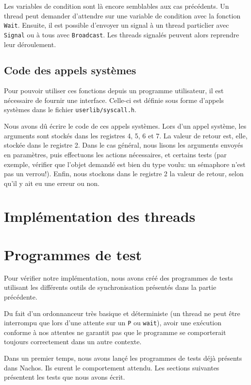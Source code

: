 \documentclass{article}
\def\file#1{\texttt{#1}}
\def\fun#1{\texttt{#1}}
\begin{document}
  Les variables de condition sont là encore semblables aux cas précédents. Un thread peut demander d'attendre sur une variable de condition avec la fonction \fun{Wait}. Ensuite, il est possible d'envoyer un signal à un thread particlier avec \fun{Signal} ou à tous avec \fun{Broadcast}. Les threads signalés peuvent alors reprendre leur déroulement.

\subsection{Code des appels systèmes}

  Pour pouvoir utiliser ces fonctions depuis un programme utilisateur, il est nécessaire de fournir une interface. Celle-ci est définie sous forme d'appels systèmes dans le fichier \file{userlib/syscall.h}.

  Nous avons dû écrire le code de ces appels systèmes. Lors d'un appel système, les arguments sont stockés dans les registres 4, 5, 6 et 7. La valeur de retour est, elle, stockée dans le registre 2.
  Dans le cas général, nous lisons les arguments envoyés en paramètres, puis effectuons les actions nécessaires, et certains tests (par exemple, vérifier que l'objet demandé est bien du type voulu: un sémaphore n'est pas un verrou!). Enfin, nous stockons dans le registre 2 la valeur de retour, selon qu'il y ait eu une erreur ou non.

\section{Implémentation des threads}

\section{Programmes de test}
Pour vérifier notre implémentation, nous avons créé des programmes de tests utilisant les différents outils de synchronisation présentés dans la partie précédente.

Du fait d'un ordonnanceur très basique et déterministe (un thread ne peut être interrompu que lors d'une attente sur un \fun{P} ou \fun{wait}), avoir une exécution conforme à nos attentes ne garantit pas que le programme se comporterait toujours correctement dans un autre contexte. 

Dans un premier temps, nous avons lançé les programmes de tests déjà présents dans Nachos. Ils eurent le comportement attendu. Les sections suivantes présentent les tests que nous avons écrit.
\end{document}
